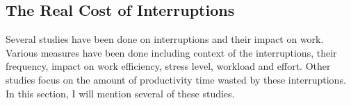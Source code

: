 \documentclass[11pt,singleside]{myfithesis2}
\begin{document}


		\subsection{The Real Cost of Interruptions }\label{costOfInterruptions}
Several studies \cite{studySpeedAndStress, studyAttention, studyDealingWithInterruptions, studyResumptionStrategies} have been done on interruptions and their impact on work. Various measures have been done including context of the interruptions, their frequency, impact on work efficiency, stress level, workload and effort. Other studies focus on the amount of productivity time wasted by these interruptions. In this section, I will mention several of these studies.
\end{document}
